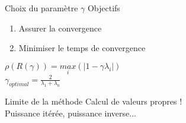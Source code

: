 \documentclass[10pt]{beamer}
\begin{document}
\begin{frame}{Choix du paramètre $\gamma$}
Objectifs
\begin{enumerate}
	\item Assurer la convergence\pause
	\item Minimiser le temps de convergence
\end{enumerate}
\pause
\begin{center}
	$\rho(R(\gamma))=\underset{i}{max}(|1-\gamma\lambda_i|)$\pause \\
	$\gamma_{optimal}=\frac{2}{\lambda_1+\lambda_n}$
\end{center}
\end{frame}
\begin{frame}{Limite de la méthode}
	\centering \Huge Calcul de \alert{valeurs propres} !\\ \pause
	\normalsize Puissance itérée, puissance inverse...  
\end{frame}
\end{document}
